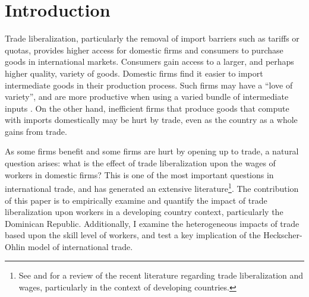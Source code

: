 \documentclass[12pt]{article}
\title{
\textmd{\textbf{\Title}}
\textbf{\author{\AuthorName \\ \Class \date{\today}}}}
\begin{document}
\newcommand{\Title}{Trade Liberalization and Wages in the Dominican Republic}
\newcommand{\Class}{Economics 4993}
\newcommand{\AuthorName}{James Sayre}
      
\maketitle
\doublespacing
\setcounter{footnote}{0}
\renewcommand{\thefootnote}{\arabic{footnote}}

\vspace{-25pt}
\begin{abstract}
I examine the impact of modern day trade liberalization on the wages of workers in the Dominican
Republic. The Central American Free Trade Agreement reduced nominal Dominican input tariffs
from an average of 12.06\% to 2.73\% from member countries, particularly the United States, over the
short period of 2006-2007. More pending. 
\end{abstract}

\vspace{-10pt}
\section{Introduction}
\label{sec:Introduction}

Trade liberalization, particularly the removal of import barriers such as tariffs or quotas, 
provides higher access for domestic firms and consumers to purchase goods in international markets. 
Consumers gain access to a larger, and perhaps higher quality, variety of goods. 
Domestic firms find it easier to import intermediate goods in their production process.
Such firms may have a ``love of variety'', and are more productive when using 
a varied bundle of intermediate inputs \citep{dixit1977monopolistic}. On the other hand, 
inefficient firms that produce goods that compute with imports domestically 
may be hurt by trade, even as the country as a whole gains from trade.

As some firms benefit and some firms are hurt by opening up to trade, a natural question arises:
what is the effect of trade liberalization upon the wages of workers in domestic firms?  
This is one of the most important questions in international trade, and has generated
an extensive literature\footnote{See \citet{feenstraglobal} and \citet{goldberg} for a review
of the recent literature regarding trade liberalization and wages, particularly in the context
of developing countries.}. The contribution of this paper 
is to empirically examine and quantify the impact of trade liberalization upon workers in a
developing country context, particularly the Dominican Republic. Additionally, I examine 
the heterogeneous impacts of trade based upon the skill level of workers, and test a key implication of
the Heckscher-Ohlin model of international trade. 
\end{document}
